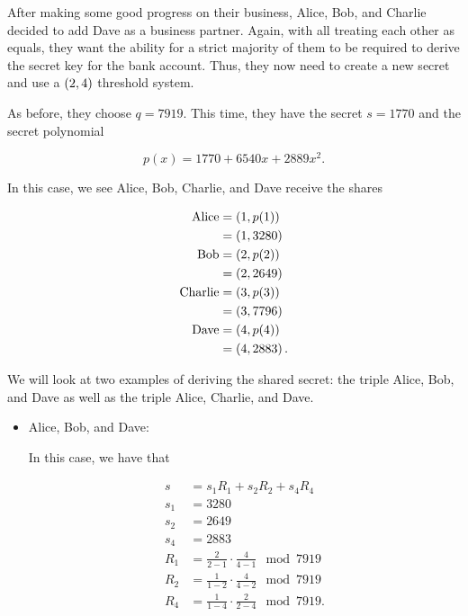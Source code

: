\begin{example}
\label{example:dkg_shamir_4}

After making some good progress on their business,
Alice, Bob, and Charlie decided to add Dave as a business partner.
Again, with all treating each other as equals, they want
the ability for a strict majority of them to be required to derive
the secret key for the bank account.
Thus, they now need to create a new secret and use a $\left( 2,4 \right)$
threshold system.

As before, they choose $q = 7919$.
This time, they have the secret $s = 1770$ and the secret polynomial

\begin{equation}
    p(x) = 1770 + 6540x + 2889x^{2}.
\end{equation}

\noindent
In this case, we see Alice, Bob, Charlie, and Dave receive the shares

\begin{align}
    \text{Alice} &= \left( 1, p(1) \right) \nonumber\\
        &= \left( 1, 3280 \right) \nonumber\\
    \text{Bob} &= \left( 2, p(2) \right) \nonumber\\
        &= \left( 2, 2649 \right) \nonumber\\
    \text{Charlie} &= \left( 3, p(3) \right) \nonumber\\
        &= \left( 3, 7796 \right) \nonumber\\
    \text{Dave} &= \left( 4, p(4) \right) \nonumber\\
        &= \left( 4, 2883 \right).
\end{align}

We will look at two examples of deriving the \gls{shared secret}:
the triple Alice, Bob, and Dave as well as the triple Alice, Charlie, and Dave.

\begin{itemize}
\item Alice, Bob, and Dave:

In this case, we have that

\begin{align}
    s &= s_{1}R_{1} + s_{2}R_{2} + s_{4}R_{4} \nonumber\\
    s_{1} &= 3280 \nonumber\\
    s_{2} &= 2649 \nonumber\\
    s_{4} &= 2883 \nonumber\\
    R_{1} &= \frac{2}{2-1}\cdot\frac{4}{4-1} \mod 7919 \nonumber\\
    R_{2} &= \frac{1}{1-2}\cdot\frac{4}{4-2} \mod 7919 \nonumber\\
    R_{4} &= \frac{1}{1-4}\cdot\frac{2}{2-4} \mod 7919.
\end{align}


\end{itemize}
\end{example}
